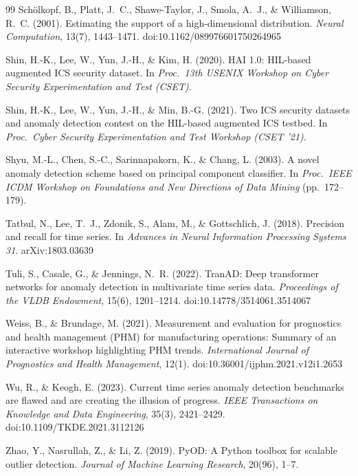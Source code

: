 \documentclass[11pt]{article}
\begin{document}
\begin{thebibliography}{99}
 Sch\"olkopf, B., Platt, J.~C., Shawe-Taylor, J., Smola, A.~J., \& Williamson, R.~C. (2001). Estimating the support of a high-dimensional distribution. \emph{Neural Computation}, 13(7), 1443--1471. doi:10.1162/089976601750264965

 Shin, H.-K., Lee, W., Yun, J.-H., \& Kim, H. (2020). HAI 1.0: HIL-based augmented ICS security dataset. In \emph{Proc.\ 13th USENIX Workshop on Cyber Security Experimentation and Test (CSET)}.

 Shin, H.-K., Lee, W., Yun, J.-H., \& Min, B.-G. (2021). Two ICS security datasets and anomaly detection contest on the HIL-based augmented ICS testbed. In \emph{Proc.\ Cyber Security Experimentation and Test Workshop (CSET '21)}.

 Shyu, M.-L., Chen, S.-C., Sarinnapakorn, K., \& Chang, L. (2003). A novel anomaly detection scheme based on principal component classifier. In \emph{Proc.\ IEEE ICDM Workshop on Foundations and New Directions of Data Mining} (pp.\ 172--179).

 Tatbul, N., Lee, T.~J., Zdonik, S., Alam, M., \& Gottschlich, J. (2018). Precision and recall for time series. In \emph{Advances in Neural Information Processing Systems 31}. arXiv:1803.03639

 Tuli, S., Casale, G., \& Jennings, N.~R. (2022). TranAD: Deep transformer networks for anomaly detection in multivariate time series data. \emph{Proceedings of the VLDB Endowment}, 15(6), 1201--1214. doi:10.14778/3514061.3514067

 Weiss, B., \& Brundage, M. (2021). Measurement and evaluation for prognostics and health management (PHM) for manufacturing operations: Summary of an interactive workshop highlighting PHM trends. \emph{International Journal of Prognostics and Health Management}, 12(1). doi:10.36001/ijphm.2021.v12i1.2653

 Wu, R., \& Keogh, E. (2023). Current time series anomaly detection benchmarks are flawed and are creating the illusion of progress. \emph{IEEE Transactions on Knowledge and Data Engineering}, 35(3), 2421--2429. doi:10.1109/TKDE.2021.3112126

 Zhao, Y., Nasrullah, Z., \& Li, Z. (2019). PyOD: A Python toolbox for scalable outlier detection. \emph{Journal of Machine Learning Research}, 20(96), 1--7.

\end{thebibliography}
\end{document}
